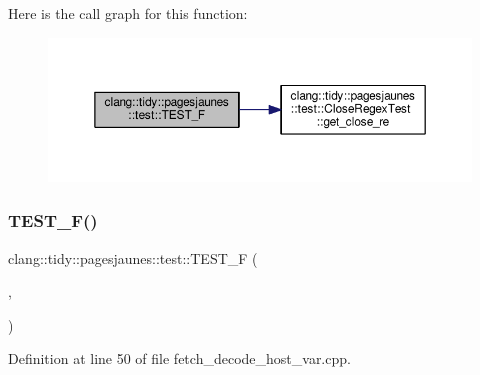 Here is the call graph for this function\+:
\nopagebreak
\begin{figure}[H]
\begin{center}
\leavevmode
\includegraphics[width=350pt]{namespaceclang_1_1tidy_1_1pagesjaunes_1_1test_a3a179a59e8986cfb08283b691a6ce4d6_cgraph}
\end{center}
\end{figure}
\mbox{\label{namespaceclang_1_1tidy_1_1pagesjaunes_1_1test_aa06fc088c3ba5f8b86254ed10d643a32}} 
\subsubsection{\texorpdfstring{T\+E\+S\+T\+\_\+\+F()}{TEST\_F()}\hspace{0.1cm}{\footnotesize\ttfamily [3/57]}}
{\footnotesize\ttfamily clang\+::tidy\+::pagesjaunes\+::test\+::\+T\+E\+S\+T\+\_\+F (\begin{DoxyParamCaption}\item[{\hyperlink{classclang_1_1tidy_1_1pagesjaunes_1_1test_1_1_fetch_decode_host_var}{Fetch\+Decode\+Host\+Var}}]{,  }\item[{Regex\+Matching\+Indicators}]{ }\end{DoxyParamCaption})}



Definition at line 50 of file fetch\+\_\+decode\+\_\+host\+\_\+var.\+cpp.

